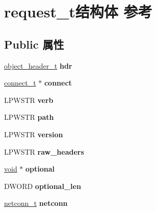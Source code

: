 \hypertarget{structrequest__t}{}\section{request\+\_\+t结构体 参考}
\label{structrequest__t}
\subsection*{Public 属性}
\begin{DoxyCompactItemize}
\item 
\mbox{\label{structrequest__t_aef10a9a7539da9b10d51738812ad1221}} 
\hyperlink{struct__object__header__t}{object\+\_\+header\+\_\+t} {\bfseries hdr}
\item 
\mbox{\label{structrequest__t_a787949530031c81a8a46ea3e8326551c}} 
\hyperlink{structconnect__t}{connect\+\_\+t} $\ast$ {\bfseries connect}
\item 
\mbox{\label{structrequest__t_a6bd28b80bbac788470b33f9cd116fc2a}} 
L\+P\+W\+S\+TR {\bfseries verb}
\item 
\mbox{\label{structrequest__t_a04ceefefcc0896ed1b8c5acd38e21780}} 
L\+P\+W\+S\+TR {\bfseries path}
\item 
\mbox{\label{structrequest__t_a4cc58134ec61af51d923fc4093cb7a81}} 
L\+P\+W\+S\+TR {\bfseries version}
\item 
\mbox{\label{structrequest__t_abb84511988fa29f8b939f05286dba074}} 
L\+P\+W\+S\+TR {\bfseries raw\+\_\+headers}
\item 
\mbox{\label{structrequest__t_aa0f5b1fef1a45dcae434b1833e03ad00}} 
\hyperlink{interfacevoid}{void} $\ast$ {\bfseries optional}
\item 
\mbox{\label{structrequest__t_ad28e5f501de07481d0e56d30d3b01a19}} 
D\+W\+O\+RD {\bfseries optional\+\_\+len}
\item 
\mbox{\label{structrequest__t_a35f7cd2ea16edf31c2f92f830b8aaffe}} 
\hyperlink{structnetconn__t}{netconn\+\_\+t} {\bfseries netconn}

\end{DoxyCompactItemize}
